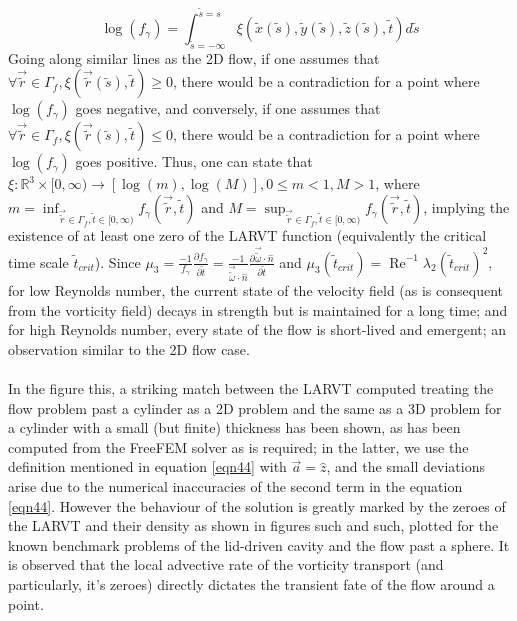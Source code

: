 \documentclass{article}
\begin{document}
\begin{equation*}
\operatorname{log}(f_\gamma) = \int_{\tilde{s}=-\infty}^{\tilde{s} = s} \xi(\tilde{x}(\tilde{s}),\tilde{y}(\tilde{s}),\tilde{z}(\tilde{s}),\tilde{t}) d\tilde{s}
\end{equation*}
Going along similar lines as the 2D flow, if one assumes that $\forall \vec{\tilde{r}} \in \Gamma_f, \xi(\vec{\tilde{r}}(\tilde{s}),\tilde{t}) \ge 0$, there would be a contradiction for a point where $\operatorname{log}(f_\gamma)$ goes negative, and conversely, if one assumes that $\forall \vec{\tilde{r}} \in \Gamma_f, \xi(\vec{\tilde{r}}(\tilde{s}),\tilde{t}) \le 0$, there would be a contradiction for a point where $\operatorname{log}(f_\gamma)$ goes positive. Thus, one can state that $\xi: \mathbb{R}^3 \times [0, \infty) \to [\operatorname{log}(m),\operatorname{log}(M)], 0 \le m < 1, M > 1$, where $m = \inf_{\vec{\tilde{r}}\in\Gamma_f,\tilde{t}\in[0, \infty)} f_\gamma(\vec{\tilde{r}},\tilde{t})$ and $M = \sup_{\vec{\tilde{r}}\in\Gamma_f,\tilde{t}\in[0, \infty)} f_\gamma(\vec{\tilde{r}},\tilde{t})$, implying the existence of at least one zero of the LARVT function (equivalently the critical time scale $\tilde{t}_{crit}$). Since $\mu_3 = \frac{-1}{f_\gamma}\frac{\partial f_\gamma}{\partial \tilde{t}} = \frac{-1}{\vec{\tilde{\omega}}\cdot \hat{n}} \frac{\partial\vec{\tilde{\omega}}\cdot \hat{n}}{\partial \tilde{t}}$ and $\mu_3(\tilde{t}_{crit}) = \operatorname{Re}^{-1}\lambda_2(\tilde{t}_{crit})^2$, for low Reynolds number, the current state of the velocity field (as is consequent from the vorticity field) decays in strength but is maintained for a long time; and for high Reynolds number, every state of the flow is short-lived and emergent; an observation similar to the 2D flow case. \\ \\
In the figure this, a striking match between the LARVT computed treating the flow problem past a cylinder as a 2D problem and the same as a 3D problem for a cylinder with a small (but finite) thickness has been shown, as has been computed from the FreeFEM solver as is required; in the latter, we use the definition mentioned in equation \ref{eqn44} with $\vec{a} = \hat{z}$, and the small deviations arise due to the numerical inaccuracies of the second term in the equation \ref{eqn44}. However the behaviour of the solution is greatly marked by the zeroes of the LARVT and their density as shown in figures such and such, plotted for the known benchmark problems of the lid-driven cavity and the flow past a sphere. It is observed that the local advective rate of the vorticity transport (and particularly, it's zeroes) directly dictates the transient fate of the flow around a point. \\ \\
\end{document}
